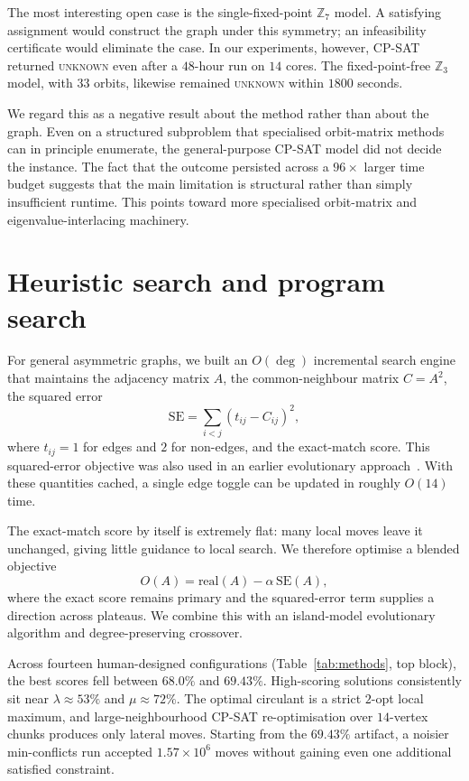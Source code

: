 \documentclass{article}
\begin{document}
The most interesting open case is the single-fixed-point
$\mathbb{Z}_7$ model. A satisfying assignment would construct the graph under
this symmetry; an infeasibility certificate would eliminate the case. In our
experiments, however, CP-SAT returned \textsc{unknown} even after a
$48$-hour run on $14$ cores. The fixed-point-free $\mathbb{Z}_3$ model, with
$33$ orbits, likewise remained \textsc{unknown} within $1800$ seconds.

We regard this as a negative result about the method rather than about the
graph. Even on a structured subproblem that specialised orbit-matrix methods
can in principle enumerate, the general-purpose CP-SAT model did not decide
the instance. The fact that the outcome persisted across a $96\times$ larger
time budget suggests that the main limitation is structural rather than
simply insufficient runtime. This points toward more specialised
orbit-matrix and eigenvalue-interlacing machinery.

\section{Heuristic search and program search}
\label{sec:heuristic}
For general asymmetric graphs, we built an $O(\deg)$ incremental search engine
that maintains the adjacency matrix $A$, the common-neighbour matrix
$C=A^2$, the squared error
\[
\mathrm{SE}=\sum_{i<j}(t_{ij}-C_{ij})^2,
\]
where $t_{ij}=1$ for edges and $2$ for non-edges, and the exact-match score.
This squared-error objective was also used in an earlier evolutionary
approach~\cite{hutnyk2019}. With these quantities cached, a single edge
toggle can be updated in roughly $O(14)$ time.

The exact-match score by itself is extremely flat: many local moves leave it
unchanged, giving little guidance to local search. We therefore optimise a
blended objective
\[
O(A)=\text{real}(A)-\alpha\,\mathrm{SE}(A),
\]
where the exact score remains primary and the squared-error term supplies a
direction across plateaus. We combine this with an island-model evolutionary
algorithm and degree-preserving crossover.

Across fourteen human-designed configurations
(Table~\ref{tab:methods}, top block), the best scores fell between
$68.0\%$ and $69.43\%$. High-scoring solutions consistently sit near
$\lambda\approx53\%$ and $\mu\approx72\%$. The optimal circulant is a strict
$2$-opt local maximum, and large-neighbourhood CP-SAT re-optimisation over
$14$-vertex chunks produces only lateral moves. Starting from the
$69.43\%$ artifact, a noisier min-conflicts run accepted
$1.57\times10^6$ moves without gaining even one additional satisfied
constraint.
\end{document}
